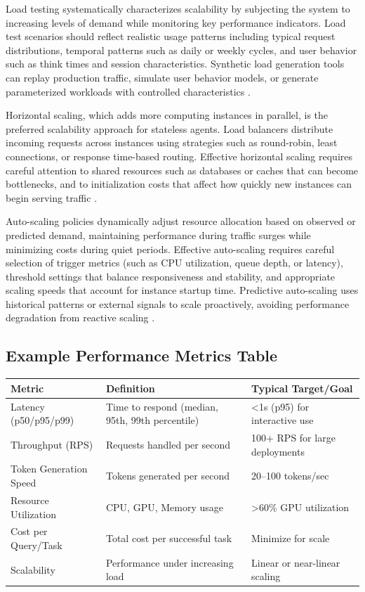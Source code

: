 \begin{TNtwocol}
Load testing systematically characterizes scalability by subjecting the system to increasing levels of demand while monitoring key performance indicators. Load test scenarios should reflect realistic usage patterns including typical request distributions, temporal patterns such as daily or weekly cycles, and user behavior such as think times and session characteristics. Synthetic load generation tools can replay production traffic, simulate user behavior models, or generate parameterized workloads with controlled characteristics \cite{shahrad2020,getmaximai2024}.

Horizontal scaling, which adds more computing instances in parallel, is the preferred scalability approach for stateless agents. Load balancers distribute incoming requests across instances using strategies such as round-robin, least connections, or response time-based routing. Effective horizontal scaling requires careful attention to shared resources such as databases or caches that can become bottlenecks, and to initialization costs that affect how quickly new instances can begin serving traffic \cite{getmaximai2024,shahrad2020}.

Auto-scaling policies dynamically adjust resource allocation based on observed or predicted demand, maintaining performance during traffic surges while minimizing costs during quiet periods. Effective auto-scaling requires careful selection of trigger metrics (such as CPU utilization, queue depth, or latency), threshold settings that balance responsiveness and stability, and appropriate scaling speeds that account for instance startup time. Predictive auto-scaling uses historical patterns or external signals to scale proactively, avoiding performance degradation from reactive scaling \cite{getmaximai2024,shahrad2020}.
\end{TNtwocol}

\begin{TNtwocol}
\section{Example Performance Metrics Table}
\begin{tabular}{p{3.5cm} p{6.5cm} p{4cm}}
\textbf{Metric} & \textbf{Definition} & \textbf{Typical Target/Goal} \\
\hline
Latency (p50/p95/p99) & Time to respond (median, 95th, 99th percentile) & <1s (p95) for interactive use \\
Throughput (RPS) & Requests handled per second & 100+ RPS for large deployments \\
Token Generation Speed & Tokens generated per second & 20–100 tokens/sec \\
Resource Utilization & CPU, GPU, Memory usage & >60\% GPU utilization \\
Cost per Query/Task & Total cost per successful task & Minimize for scale \\
Scalability & Performance under increasing load & Linear or near-linear scaling \\
\end{tabular}
\end{TNtwocol}
